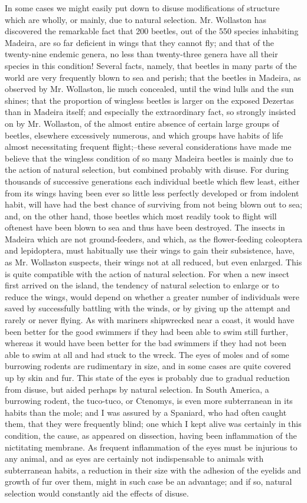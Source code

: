 In some cases we might easily put down to disuse modifications of structure which are wholly, or mainly, due to natural selection. Mr. Wollaston has discovered the remarkable fact that 200 beetles, out of the 550 species inhabiting Madeira, are so far deficient in wings that they cannot fly; and that of the twenty-nine endemic genera, no less than twenty-three genera have all their species in this condition! Several facts, namely, that beetles in many parts of the world are very frequently blown to sea and perish; that the beetles in Madeira, as observed by Mr. Wollaston, lie much concealed, until the wind lulls and the sun shines; that the proportion of wingless beetles is larger on the exposed Dezertas than in Madeira itself; and especially the extraordinary fact, so strongly insisted on by Mr. Wollaston, of the almost entire absence of certain large groups of beetles, elsewhere excessively numerous, and which groups have habits of life almost necessitating frequent flight;--these several considerations have made me believe that the wingless condition of so many Madeira beetles is mainly due to the action of natural selection, but combined probably with disuse. For during thousands of successive generations each individual beetle which flew least, either from its wings having been ever so little less perfectly developed or from indolent habit, will have had the best chance of surviving from not being blown out to sea; and, on the other hand, those beetles which most readily took to flight will oftenest have been blown to sea and thus have been destroyed.
The insects in Madeira which are not ground-feeders, and which, as the flower-feeding coleoptera and lepidoptera, must habitually use their wings to gain their subsistence, have, as Mr. Wollaston suspects, their wings not at all reduced, but even enlarged. This is quite compatible with the action of natural selection. For when a new insect first arrived on the island, the tendency of natural selection to enlarge or to reduce the wings, would depend on whether a greater number of individuals were saved by successfully battling with the winds, or by giving up the attempt and rarely or never flying. As with mariners shipwrecked near a coast, it would have been better for the good swimmers if they had been able to swim still further, whereas it would have been better for the bad swimmers if they had not been able to swim at all and had stuck to the wreck.
The eyes of moles and of some burrowing rodents are rudimentary in size, and in some cases are quite covered up by skin and fur. This state of the eyes is probably due to gradual reduction from disuse, but aided perhaps by natural selection. In South America, a burrowing rodent, the tuco-tuco, or Ctenomys, is even more subterranean in its habits than the mole; and I was assured by a Spaniard, who had often caught them, that they were frequently blind; one which I kept alive was certainly in this condition, the cause, as appeared on dissection, having been inflammation of the nictitating membrane. As frequent inflammation of the eyes must be injurious to any animal, and as eyes are certainly not indispensable to animals with subterranean habits, a reduction in their size with the adhesion of the eyelids and growth of fur over them, might in such case be an advantage; and if so, natural selection would constantly aid the effects of disuse.
